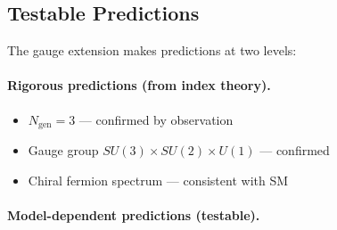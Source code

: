 \subsection{Testable Predictions}\label{sec:quantum-tests}

The gauge extension makes predictions at two levels:

\paragraph{Rigorous predictions (from index theory).}
\begin{itemize}
\item $N_{\text{gen}} = 3$ --- confirmed by observation
\item Gauge group $SU(3) \times SU(2) \times U(1)$ --- confirmed
\item Chiral fermion spectrum --- consistent with SM
\end{itemize}

\paragraph{Model-dependent predictions (testable).}

\begin{table}[h]
\centering
\caption{Predictions from the gauge extension.}\label{tab:gauge-predictions}
\end{table}

